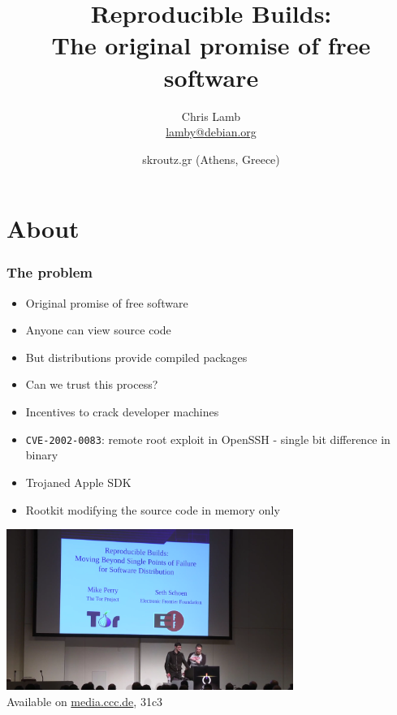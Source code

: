 \documentclass[14pt,aspectratio=169]{beamer}
\title[Reproducible Builds]{Reproducible Builds: \\ The original promise of free software}
\author[lamby]{%
   \texorpdfstring{
            \centering
            Chris Lamb \\ 
            \href{mailto:lamby@debian.org}{lamby@debian.org}
   }{lamby}}
\date[skroutz.gr '15]{%
 skroutz.gr (Athens, Greece)
}
\begin{document}
\begin{frame}
\titlepage
\end{frame}

\section{About}

\begin{frame}[fragile]
 \frametitle{The problem}
 \begin{itemize}
  \item Original promise of free software \pause
  \item Anyone can view source code \pause
  \item But distributions provide compiled packages \pause
  \item Can we trust this process?
 \end{itemize}
\end{frame}

\begin{frame}[fragile]
 \pause
 \begin{itemize}
  \item Incentives to crack developer machines \pause
  \item \texttt{CVE-2002-0083}: remote root exploit in OpenSSH - single bit difference in binary \pause
  \item Trojaned Apple SDK \pause
  \item Rootkit modifying the source code in memory only
 \end{itemize}
\end{frame}

\begin{frame}
 \begin{center}
  \includegraphics[width=0.7\textwidth]{images/31c3.png}
  \\
  Available on \url{media.ccc.de}, 31c3
 \end{center}
\end{frame}
\end{document}
